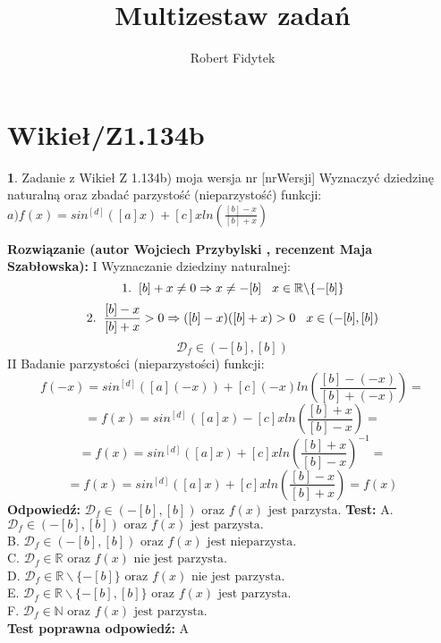 \documentclass[12pt, a4paper]{article}
\title{Multizestaw zadań}
\author{Robert Fidytek}
\date{}
\theoremstyle{definition} %
\newtheorem{zad}{}
\newcommand{\kategoria}[1]{\section{#1}} %
\newcommand{\zadStart}[1]{\begin{zad}#1\newline} %
\newcommand{\zadStop}{\end{zad}}   %
\newcommand{\rozwStart}[2]{\noindent \textbf{Rozwiązanie (autor #1 , recenzent #2): }\newline} %
\newcommand{\rozwStop}{\newline}                                            %
\newcommand{\odpStart}{\noindent \textbf{Odpowiedź:}\newline}    %
\newcommand{\odpStop}{\newline}                                             %
\newcommand{\testStart}{\noindent \textbf{Test:}\newline} %
\newcommand{\testStop}{\newline} %
\newcommand{\kluczStart}{\noindent \textbf{Test poprawna odpowiedź:}\newline} %
\newcommand{\kluczStop}{\newline} %
\begin{document}
\maketitle


\kategoria{Wikieł/Z1.134b}
\zadStart{Zadanie z Wikieł Z 1.134b) moja wersja nr [nrWersji]}
Wyznaczyć dziedzinę naturalną oraz zbadać parzystość (nieparzystość) funkcji:\\
$a) f(x)=sin^{[d]}([a]x)+[c]xln(\frac{[b]-x}{[b]+x})$
\zadStop
\rozwStart{Wojciech Przybylski}{Maja Szabłowska}
I Wyznaczanie dziedziny naturalnej:\\
$$1.\hspace{2mm} [b]+x\neq0 \Rightarrow x\neq-[b] \hspace{3mm} x\in\mathbb{R}\backslash\{-[b]\}$$
$$2.\hspace{2mm}\frac{[b]-x}{[b]+x}>0 \Rightarrow ([b]-x)([b]+x)>0\hspace{3mm} x\in (-[b],[b])$$
$$\mathcal{D}_{f}\in (-[b],[b])$$
II Badanie parzystości (nieparzystości) funkcji:
$$f(-x)=sin^{[d]}([a](-x))+[c](-x)ln(\frac{[b]-(-x)}{[b]+(-x)})=$$
$$=f(x)=sin^{[d]}([a]x)-[c]xln(\frac{[b]+x}{[b]-x})=$$
$$=f(x)=sin^{[d]}([a]x)+[c]xln(\frac{[b]+x}{[b]-x})^{-1}=$$
$$=f(x)=sin^{[d]}([a]x)+[c]xln(\frac{[b]-x}{[b]+x})=f(x)$$
\rozwStop
\odpStart
$\mathcal{D}_{f}\in (-[b],[b]) \mbox{ oraz } f(x)\mbox{ jest parzysta.}$ 
\odpStop
\testStart
A. $\mathcal{D}_{f}\in (-[b],[b]) \mbox{ oraz } f(x)\mbox{ jest parzysta.}$ \\
B. $\mathcal{D}_{f}\in (-[b],[b]) \mbox{ oraz } f(x)\mbox{ jest nieparzysta.}$ \\
C. $\mathcal{D}_{f}\in \mathbb{R} \mbox{ oraz } f(x)\mbox{ nie jest parzysta.}$ \\
D. $\mathcal{D}_{f}\in \mathbb{R}\backslash\{-[b]\} \mbox{ oraz } f(x)\mbox{ nie jest parzysta.}$ \\
E. $\mathcal{D}_{f}\in \mathbb{R}{\backslash}\{-[b],[b]\} \mbox{ oraz } f(x)\mbox{ jest parzysta.}$ \\
F. $\mathcal{D}_{f}\in \mathbb{N} \mbox{ oraz } f(x)\mbox{ jest parzysta.}$ \\
\testStop
\kluczStart
A
\kluczStop
\end{document}
